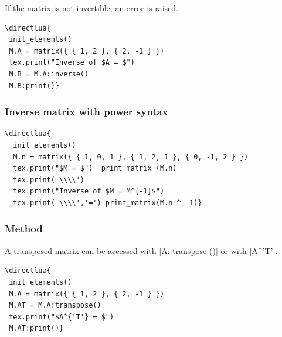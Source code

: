 If the matrix is not invertible, an error is raised.

\begin{minipage}{.6\textwidth}
\begin{verbatim}
\directlua{
 init_elements()
 M.A = matrix({ { 1, 2 }, { 2, -1 } })
 tex.print("Inverse of $A = $")
 M.B = M.A:inverse()
 M.B:print()}
\end{verbatim}
\end{minipage}
\begin{minipage}{.4\textwidth}
\end{minipage}

\subsubsection{Inverse matrix with power syntax}
\label{ssub:inverse_matrix_with_power_syntax}

\begin{minipage}{.6\textwidth}
\begin{verbatim}
\directlua{
  init_elements()
  M.n = matrix({ { 1, 0, 1 }, { 1, 2, 1 }, { 0, -1, 2 } })
  tex.print("$M = $")  print_matrix (M.n)
  tex.print('\\\\')
  tex.print("Inverse of $M = M^{-1}$")
  tex.print('\\\\','=') print_matrix(M.n ^ -1)}
\end{verbatim}
\end{minipage}
\begin{minipage}{.4\textwidth}
\end{minipage}

\subsubsection{Method  }
\label{ssub:transpose_matrix}

A transposed matrix can be accessed with |A: transpose ()| or with |A^{'T'}|.

\vspace{.5em}
\begin{minipage}{.6\textwidth}
\begin{verbatim}
\directlua{
 init_elements()
 M.A = matrix({ { 1, 2 }, { 2, -1 } })
 M.AT = M.A:transpose()
 tex.print("$A^{'T'} = $")
 M.AT:print()}
\end{verbatim}
\end{minipage}
\begin{minipage}{.4\textwidth}
\end{minipage}

